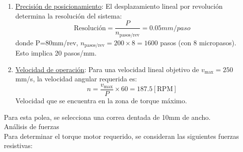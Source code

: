 \begin{enumerate}
    \item \underline{Precisión de posicionamiento}: El desplazamiento lineal por revolución determina la resolución del sistema:
    \begin{equation}
    \text{Resolución} = \frac{P}{n_{\text{pasos/rev}}} = 0.05mm/paso
    \end{equation}
    donde P=80mm/rev, $n_{\text{pasos/rev}} = 200 \times 8 = 1600$ pasos (con 8 micropasos). Esto implica 20 pasos/mm.
    \item \underline{Velocidad de operación}: Para una velocidad lineal objetivo de $v_{\text{max}} = 250$\,mm/s, la velocidad angular requerida es:
    \begin{equation}
    n = \frac{v_{\text{max}}}{P} \times 60 = 187.5 [\text{RPM}] 
    \end{equation}
    Velocidad que se encuentra en la zona de torque máximo.
\end{enumerate}
Para esta polea, se selecciona una correa dentada de 10mm de ancho.\\

Análisis de fuerzas\\
Para determinar el torque motor requerido, se consideran las siguientes fuerzas resistivas:

